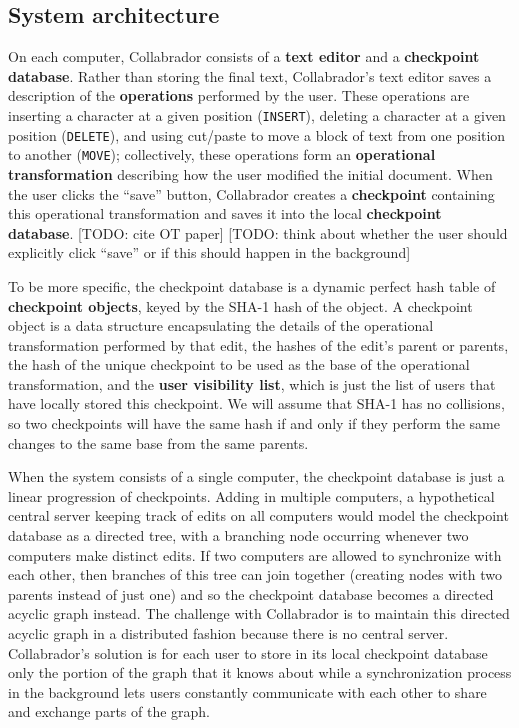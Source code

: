 \documentclass[11pt,titlepage]{article}
\begin{document}
\subsection{System architecture}

On each computer, Collabrador consists of a \textbf{text editor} and a \textbf{checkpoint database}. Rather than storing the final text, Collabrador's text editor saves a description of the \textbf{operations} performed by the user. These operations are inserting a character at a given position (\texttt{INSERT}), deleting a character at a given position (\texttt{DELETE}), and using cut/paste to move a block of text from one position to another (\texttt{MOVE}); collectively, these operations form an \textbf{operational transformation} describing how the user modified the initial document. When the user clicks the ``save'' button, Collabrador creates a \textbf{checkpoint} containing this operational transformation and saves it into the local \textbf{checkpoint database}. [TODO: cite OT paper] [TODO: think about whether the user should explicitly click ``save'' or if this should happen in the background]

To be more specific, the checkpoint database is a dynamic perfect hash table of \textbf{checkpoint objects}, keyed by the SHA-1 hash of the object. A checkpoint object is a data structure encapsulating the details of the operational transformation performed by that edit, the hashes of the edit's parent or parents, the hash of the unique checkpoint to be used as the base of the operational transformation, and the \textbf{user visibility list}, which is just the list of users that have locally stored this checkpoint. We will assume that SHA-1 has no collisions, so two checkpoints will have the same hash if and only if they perform the same changes to the same base from the same parents.

When the system consists of a single computer, the checkpoint database is just a linear progression of checkpoints. Adding in multiple computers, a hypothetical central server keeping track of edits on all computers would model the checkpoint database as a directed tree, with a branching node occurring whenever two computers make distinct edits. If two computers are allowed to synchronize with each other, then branches of this tree can join together (creating nodes with two parents instead of just one) and so the checkpoint database becomes a directed acyclic graph instead. The challenge with Collabrador is to maintain this directed acyclic graph in a distributed fashion because there is no central server. Collabrador's solution is for each user to store in its local checkpoint database only the portion of the graph that it knows about while a synchronization process in the background lets users constantly communicate with each other to share and exchange parts of the graph.
\end{document}
